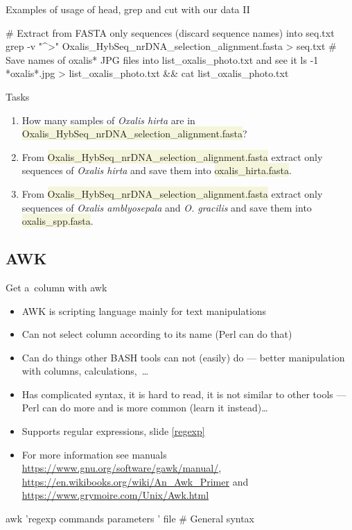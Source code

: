 \documentclass[compress, ucs, xelatex, 11pt, xcolor=svgnames, aspectratio=169,
	hyperref={
		bookmarks=true,
		unicode=true,
		colorlinks=true,
		pdftitle={Linux, command line and MetaCentrum},
		plainpages=false,
		pdfauthor={Vojtech Zeisek},
		pdfsubject={Course about use of Linux command line, writing shell scripts and using MetaCentrum of CESNET},
		pdfcreator={XeLaTeX},
		pdfkeywords={Linux, GNU, BASH, shell, command line, MetaCentrum},
		linkcolor=DarkRed, %
		anchorcolor=DarkBlue, %
		citecolor=Indigo, %
		filecolor=NavyBlue, %
		menucolor=DarkMagenta, %
		urlcolor=DarkBlue, %
		pdftex},
	url={hyphens, lowtilde} %
	]{beamer}
\renewcommand{\texttt}[1]{\colorbox{Beige}{{\ttfamily #1}}}
\begin{document}
\begin{frame}[fragile]{Examples of usage of head, grep and cut with our data II}
	\begin{bashcode}
    # Extract from FASTA only sequences (discard sequence names) into seq.txt
    grep -v "^>" Oxalis_HybSeq_nrDNA_selection_alignment.fasta > seq.txt
    # Save names of oxalis* JPG files into list_oxalis_photo.txt and see it
    ls -1 *oxalis*.jpg > list_oxalis_photo.txt && cat list_oxalis_photo.txt
	\end{bashcode}
	\begin{block}{Tasks}
		\begin{enumerate}
			\item How many samples of \textit{Oxalis hirta} are in \texttt{Oxalis\_HybSeq\_nrDNA\_selection\_alignment.fasta}?
			\item From \texttt{Oxalis\_HybSeq\_nrDNA\_selection\_alignment.fasta} extract only sequences of \textit{Oxalis hirta} and save them into \texttt{oxalis\_hirta.fasta}.
			\item From \texttt{Oxalis\_HybSeq\_nrDNA\_selection\_alignment.fasta} extract only sequences of \textit{Oxalis amblyosepala} and \textit{O. gracilis} and save them into \texttt{oxalis\_spp.fasta}.
		\end{enumerate}
	\end{block}
\end{frame}

\subsection{AWK}

\begin{frame}[fragile]{Get a~column with awk}
	\begin{itemize}
		\item AWK is scripting language mainly for text manipulations
		\item Can not select column according to its name (Perl can do that)
		\item Can do things other BASH tools can not (easily) do --- better manipulation with columns, calculations,~\ldots
		\item Has complicated syntax, it is hard to read, it is not similar to other tools --- Perl can do more and is more common (learn it instead)\ldots
		\item Supports regular expressions, slide \ref{regexp}
		\item For more information see manuals \url{https://www.gnu.org/software/gawk/manual/}, \url{https://en.wikibooks.org/wiki/An_Awk_Primer} and \url{https://www.grymoire.com/Unix/Awk.html}
	\end{itemize}
	\vfill
	\begin{bashcode}
    awk 'regexp { commands parameters }' file # General syntax
	\end{bashcode}
\end{frame}
\end{document}
